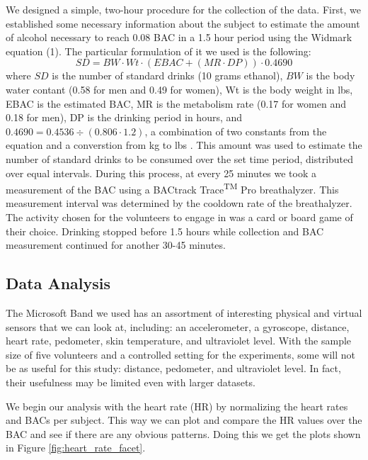 We designed a simple, two-hour procedure for the collection of the data. First, we established some necessary information about the subject to estimate the amount of alcohol necessary to reach 0.08 BAC in a 1.5 hour period using the Widmark equation (1). The particular formulation of it we used is the following: \begin{equation}
SD =  BW \cdot Wt \cdot (EBAC + (MR \cdot DP)) \cdot 0.4690
\end{equation} where $SD$ is the number of standard drinks (10 grams ethanol), $BW$ is the body water contant (0.58 for men and 0.49 for women), Wt is the body weight in lbs, EBAC is the estimated BAC, MR is the metabolism rate (0.17 for women and 0.18 for men), DP is the drinking period in hours, and  $0.4690 = 0.4536 \div (0.806 \cdot 1.2)$, a combination of two constants from the equation and a converstion from kg to lbs \cite{Andersson:2009}\cite{Wiki:BAC}. This amount was used to estimate the number of standard drinks to be consumed over the set time period, distributed over equal intervals. During this process, at every 25 minutes we took a measurement of the BAC using a BACtrack Trace\textsuperscript{TM} Pro breathalyzer. This measurement interval was determined by the cooldown rate of the breathalyzer. The activity chosen for the volunteers to engage in was a card or board game of their choice. Drinking stopped before 1.5 hours while collection and BAC measurement continued for another 30-45 minutes.

\subsection{Data Analysis}

The Microsoft Band we used has an assortment of interesting physical and virtual sensors that we can look at, including: an accelerometer, a gyroscope, distance, heart rate, pedometer, skin temperature, and ultraviolet level. With the sample size of five volunteers and a controlled setting for the experiments, some will not be as useful for this study: distance, pedometer, and ultraviolet level. In fact, their usefulness may be limited even with larger datasets. 

We begin our analysis with the heart rate (HR) by normalizing the heart rates and BACs per subject. This way we can plot and compare the HR values over the BAC and see if there are any obvious patterns. Doing this we get the plots shown in Figure \ref{fig:heart_rate_facet}.

